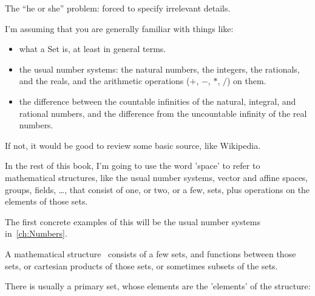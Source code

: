 \documentclass[11pt,openany]{book}
\begin{document}
The ``he or she'' problem: forced to specify irrelevant details.
\setcounter{currentlevel}{\value{baseSectionLevel}}

I'm assuming that you are generally familiar with things like:
\begin{itemize}
  \item what a \gls{Set} is, at least in general terms.
  \item the usual number systems: 
the natural numbers, the integers, the rationals, and the reals, 
and the arithmetic operations ($+$, $-$, $*$, $/$) on them.
\item the difference between the
countable infinities of the natural, integral, and rational numbers,
and the difference from the uncountable infinity of the real numbers.
\end{itemize} 

If not, it would be good to review some basic source, like Wikipedia.

In the rest of this book, I'm going to use the word 'space' to refer to
mathematical structures, like the usual number systems, vector and affine
spaces, groups, fields, \ldots, that consist of one, or two, or a few, sets,
plus operations on the elements of those sets.

The first concrete examples of this will be the usual number systems 
in~\autoref{ch:Numbers}.
\setcounter{currentlevel}{\value{baseSectionLevel}}

\setcounter{currentlevel}{\value{baseSectionLevel}}

\setcounter{currentlevel}{\value{baseSectionLevel}}

A mathematical structure~\cite{wiki:Mathematical-structure} 
consists of a few sets, and functions between those sets,
or cartesian products of those sets,
or sometimes subsets of the sets.

There is usually a primary set, whose elements are the 'elements'
of the structure:
\end{document}

